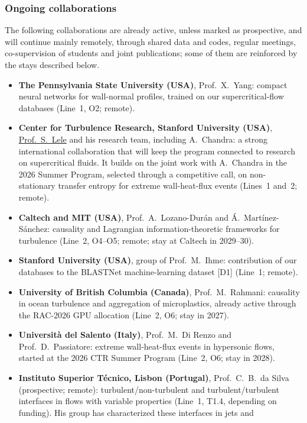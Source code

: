 \documentclass[11pt]{article}
\begin{document}
\subsubsection*{Ongoing collaborations}
The following collaborations are already active, unless marked as prospective, and will continue mainly remotely, through shared
data and codes, regular meetings, co-supervision of students and joint publications; some of them
are reinforced by the stays described below.
\begin{itemize}
  \item \textbf{The Pennsylvania State University (USA)}, Prof.\ X.\ Yang: compact neural networks
  for wall-normal profiles, trained on our supercritical-flow databases (Line~1, O2; remote).
  \item \textbf{Center for Turbulence Research, Stanford University (USA)},
  \href{https://me.stanford.edu/people/sanjiva-lele}{Prof.\ S.\ Lele} and his research team, including
  A.\ Chandra: a strong international collaboration that will keep the program connected to research
  on supercritical fluids. It builds on the joint work with A.\ Chandra in the 2026 Summer Program,
  selected through a competitive call, on non-stationary transfer entropy for extreme wall-heat-flux
  events (Lines~1 and~2; remote).
  \item \textbf{Caltech and MIT (USA)}, Prof.\ A.\ Lozano-Dur\'an and \'A.\ Mart\'inez-S\'anchez:
  causality and Lagrangian information-theoretic frameworks for turbulence (Line~2, O4--O5; remote; stay at Caltech in 2029--30).
  \item \textbf{Stanford University (USA)}, group of Prof.\ M.\ Ihme: contribution of our databases
  to the BLASTNet machine-learning dataset [D1] (Line~1; remote).
  \item \textbf{University of British Columbia (Canada)}, Prof.\ M.\ Rahmani: causality in ocean
  turbulence and aggregation of microplastics, already active through the RAC-2026 GPU allocation
  (Line~2, O6; stay in 2027).
  \item \textbf{Universit\`a del Salento (Italy)}, Prof.\ M.\ Di Renzo and Prof.\ D.\ Passiatore:
  extreme wall-heat-flux events in hypersonic flows, started at the 2026 CTR Summer Program
  (Line~2, O6; stay in 2028).
  \item \textbf{Instituto Superior T\'ecnico, Lisbon (Portugal)}, Prof.\ C.\ B.\ da Silva
  (prospective; remote): turbulent/non-turbulent and turbulent/turbulent interfaces in flows with
  variable properties (Line~1, T1.4, depending on funding). His group has characterized these interfaces in jets and

\end{itemize}
\end{document}
